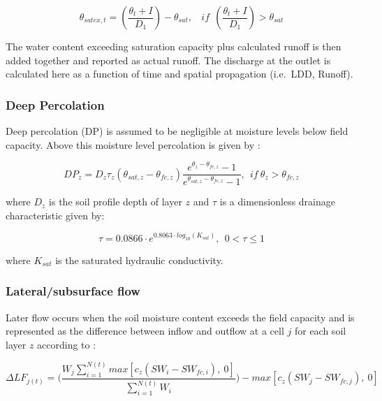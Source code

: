 \documentclass[]{article}
\begin{document}
\begin{equation}
\theta_{satex,t}=(\frac{\theta_t+I}{D_1})-\theta_{sat},  ~~~~if~~(\frac{\theta_t+I}{D_1})>\theta_{sat}
\label{eq:thetat}  
\end{equation}

The water content exceeding saturation capacity plus calculated runoff
is then added together and reported as actual runoff. The discharge at
the outlet is calculated here as a function of time and spatial
propagation (i.e.~LDD, Runoff).

\hypertarget{deep-percolation}{%
\subsubsection{Deep Percolation}\label{deep-percolation}}

Deep percolation (DP) is assumed to be negligible at moisture levels
below field capacity. Above this moisture level percolation is given by
\cite{Raes2002}:

\begin{equation}
DP_z = D_z \tau_z (\theta_{sat, z} - \theta_{fc, z}) \frac{e^{\theta_z-\theta_{fc,z}}-1}{e^{\theta_{sat, z}-\theta_{fc,z}}-1},~~if~ \theta_z > \theta_{fc, z} 
\label{eq:DP}  
\end{equation}

where \(D_z\) is the soil profile depth of layer \(z\) and \(\tau\) is a
dimensionless drainage characteristic given by:

\begin{equation}
\tau = 0.0866 \cdot e^{0.8063 \cdot log_{10}(K_{sat})}, ~~0< \tau \leq 1
\label{eq:tau}  
\end{equation}

where \(K_{sat}\) is the saturated hydraulic conductivity.

\hypertarget{lateralsubsurface-flow}{%
\subsubsection{Lateral/subsurface flow}\label{lateralsubsurface-flow}}

Later flow occurs when the soil moisture content exceeds the field
capacity and is represented as the difference between inflow and outflow
at a cell \(j\) for each soil layer \(z\) according to
\cite{Manfreda2005}:

\begin{equation}
\Delta LF_{j(t)} = \Big( \frac{W_{j} \sum^{N(t)}_{i=1}max[c_{z}(SW_{i}-SW_{fc,i}),~0] }{ \sum^{N(t)}_{i=1} W_{i} } \Big) - max[c_z(SW_j-SW_{fc,j}),~0]
\label{eq:LF}  
\end{equation}
\end{document}

